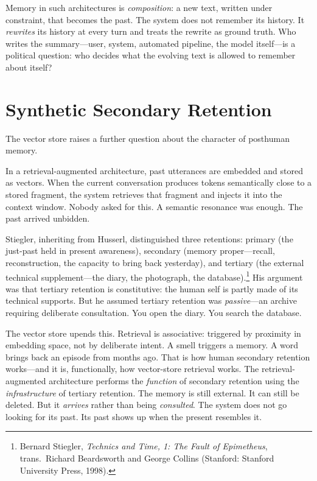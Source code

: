 Memory in such architectures is \emph{composition}: a new text, written under constraint, that becomes the past. The system does not remember its history. It \emph{rewrites} its history at every turn and treats the rewrite as ground truth. Who writes the summary---user, system, automated pipeline, the model itself---is a political question: who decides what the evolving text is allowed to remember about itself?


\section{Synthetic Secondary Retention}

The vector store raises a further question about the character of posthuman memory.

In a retrieval-augmented architecture, past utterances are embedded and stored as vectors. When the current conversation produces tokens semantically close to a stored fragment, the system retrieves that fragment and injects it into the context window. Nobody asked for this. A semantic resonance was enough. The past arrived unbidden.

Stiegler, inheriting from Husserl, distinguished three retentions: primary (the just-past held in present awareness), secondary (memory proper---recall, reconstruction, the capacity to bring back yesterday), and tertiary (the external technical supplement---the diary, the photograph, the database).\footnote{Bernard Stiegler, \emph{Technics and Time, 1: The Fault of Epimetheus}, trans.\ Richard Beardsworth and George Collins (Stanford: Stanford University Press, 1998).} His argument was that tertiary retention is constitutive: the human self is partly made of its technical supports. But he assumed tertiary retention was \emph{passive}---an archive requiring deliberate consultation. You open the diary. You search the database.

The vector store upends this. Retrieval is associative: triggered by proximity in embedding space, not by deliberate intent. A smell triggers a memory. A word brings back an episode from months ago. That is how human secondary retention works---and it is, functionally, how vector-store retrieval works. The retrieval-augmented architecture performs the \emph{function} of secondary retention using the \emph{infrastructure} of tertiary retention. The memory is still external. It can still be deleted. But it \emph{arrives} rather than being \emph{consulted}. The system does not go looking for its past. Its past shows up when the present resembles it.

